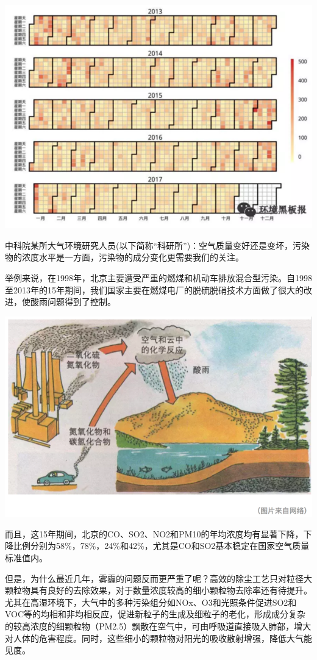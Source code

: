 \documentclass[
]{book}
\begin{document}
\includegraphics[width=8.33in]{images/air1}

中科院某所大气环境研究人员(以下简称``科研所'')：空气质量变好还是变坏，污染物的浓度水平是一方面，污染物的成分变化更需要我们的关注。

举例来说，在1998年，北京主要遭受严重的燃煤和机动车排放混合型污染。自1998至2013年的15年期间，我们国家主要在燃煤电厂的脱硫脱硝技术方面做了很大的改进，使酸雨问题得到了控制。

\includegraphics[width=8.33in]{images/air2}

而且，这15年期间，北京的CO、SO2、NO2和PM10的年均浓度均有显著下降，下降比例分别为58\%，78\%，24\%和42\%，尤其是CO和SO2基本稳定在国家空气质量标准值内。

但是，为什么最近几年，雾霾的问题反而更严重了呢？高效的除尘工艺只对粒径大颗粒物具有良好的去除效果，对于数量浓度较高的细小颗粒物去除率还有待提升。尤其在高湿环境下，大气中的多种污染组分如NOx、O3和光照条件促进SO2和VOC等的均相和非均相反应，促进新粒子的生成及细粒子的老化，形成成分复杂的较高浓度的细颗粒物（PM2.5）飘散在空气中，可由呼吸道直接吸入肺部，增大对人体的危害程度。同时，这些细小的颗粒物对阳光的吸收散射增强，降低大气能见度。
\end{document}
